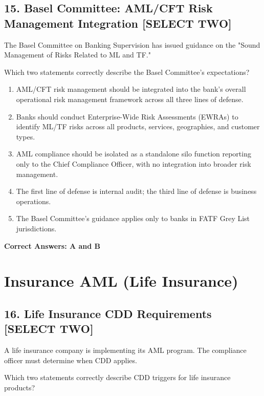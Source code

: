 \documentclass[11pt,a4paper]{article}
\begin{document}
	\subsection{15. Basel Committee: AML/CFT Risk Management Integration \textnormal{[SELECT TWO]}}
	
	The Basel Committee on Banking Supervision has issued guidance on the "Sound Management of Risks Related to ML and TF."
	
	Which two statements correctly describe the Basel Committee's expectations?
	
	\begin{enumerate}[label=\Alph*.]
		\item AML/CFT risk management should be integrated into the bank's overall operational risk management framework across all three lines of defense.
		\item Banks should conduct Enterprise-Wide Risk Assessments (EWRAs) to identify ML/TF risks across all products, services, geographies, and customer types.
		\item AML compliance should be isolated as a standalone silo function reporting only to the Chief Compliance Officer, with no integration into broader risk management.
		\item The first line of defense is internal audit; the third line of defense is business operations.
		\item The Basel Committee's guidance applies only to banks in FATF Grey List jurisdictions.
	\end{enumerate}
	
	\textbf{Correct Answers: A and B}
	
	\section{Insurance AML (Life Insurance)}
	
	\subsection{16. Life Insurance CDD Requirements \textnormal{[SELECT TWO]}}
	
	A life insurance company is implementing its AML program. The compliance officer must determine when CDD applies.
	
	Which two statements correctly describe CDD triggers for life insurance products?
	
\end{document}
